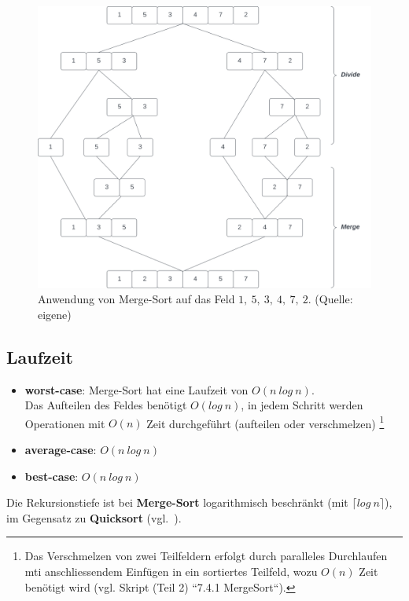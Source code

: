 \begin{figure}
    \begin{center}
        \includegraphics[scale=0.3]{chapters/Sortierverfahren/img/mergesort}
        \caption{Anwendung von Merge-Sort auf das Feld $1,\ 5,\ 3,\ 4,\ 7,\ 2$.  (Quelle: eigene)}
        \label{fig:mergesort}
    \end{center}
\end{figure}


\subsection{Laufzeit}

\begin{itemize}
    \item \textbf{worst-case}: Merge-Sort hat eine Laufzeit von $O(n\ log\ n)$.\\
        Das Aufteilen des Feldes benötigt $O(log\ n)$, in jedem Schritt werden Operationen mit $O(n)$ Zeit durchgeführt (aufteilen  oder verschmelzen) \footnote{
        Das Verschmelzen von zwei Teilfeldern erfolgt durch paralleles Durchlaufen mti anschliessendem Einfügen in ein sortiertes Teilfeld, wozu $O(n)$ Zeit benötigt wird (vgl. Skript (Teil 2) ``7.4.1 MergeSort``).
    }
    \item \textbf{average-case}: $O(n\ log\ n)$
    \item \textbf{best-case}: $O(n\ log\ n)$
\end{itemize}

\begin{tcolorbox}
    Die Rekursionstiefe ist bei \textbf{Merge-Sort} logarithmisch beschränkt (mit $\lceil log\ n \rceil$), im Gegensatz zu \textbf{Quicksort} (vgl.~\cite[116]{OW17b}).
\end{tcolorbox}